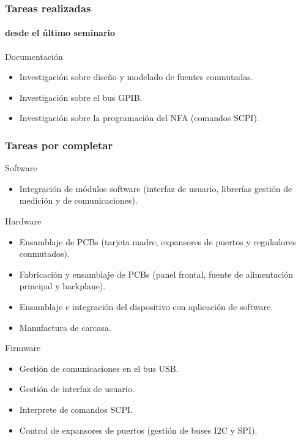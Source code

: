 \documentclass[xcolor=pdftext, table]{beamer}
\begin{document}

		\begin{frame}
			\frametitle{Tareas realizadas}
			\framesubtitle{desde el último seminario}
			
			\begin{block}{Documentación}
				\begin{itemize}
					\item Investigación sobre diseño y modelado de fuentes conmutadas.
					\item Investigación sobre el bus GPIB.
					\item Investigación sobre la programación del NFA (comandos SCPI).
				 \end{itemize}		
			 \end{block}	 
		
		\end{frame}
		

	\begin{frame} 
		\frametitle{Tareas por completar}
		
		\small
		
		Software		
		\begin{itemize}
			\item  Integración de módulos software {\tiny (interfaz de usuario, librerías gestión de medición y de comunicaciones).}
		\end{itemize}
		
		Hardware		
		\begin{itemize}
			\item Ensamblaje de PCBs {\tiny (tarjeta madre, expansores de puertos y reguladores conmutados).}
			\item Fabricación y ensamblaje de PCBs {\tiny (panel frontal, fuente de alimentación principal y backplane).}
			\item Ensamblaje e integración del dispositivo con aplicación de software.
			\item Manufactura de carcasa.
		\end{itemize}
		
		Firmware
		\begin{itemize}
			\item Gestión de comunicaciones en el bus USB.
			\item Gestión de interfaz de usuario.
			\item Interprete de comandos SCPI.
			\item Control de expansores de puertos {\tiny (gestión de buses I2C y SPI).}
		\end{itemize}
		
	\end{frame}
	
\end{document}
